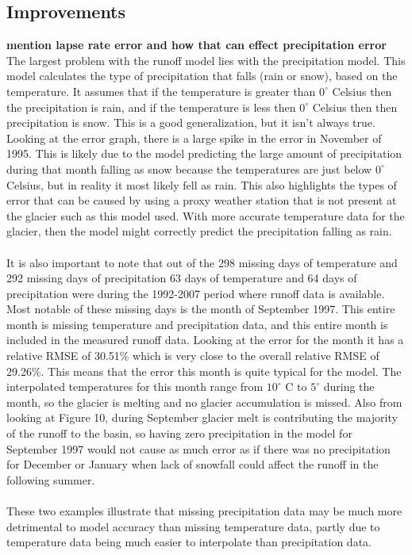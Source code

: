 \documentclass{article}
\begin{document}
\subsection{Improvements}
\textbf{mention lapse rate error and how that can effect precipitation error}
The largest problem with the runoff model lies with the precipitation model. This model calculates the type of precipitation that falls (rain or 
snow), based on the temperature. It assumes that if the temperature is greater than $0^\circ$ Celsius then the precipitation is rain, and if the 
temperature is less then $0^\circ$ Celsius then then precipitation is snow. This is a good generalization, but it isn't always true. Looking at the 
error graph, there is a large spike in the error in November of 1995. This is likely due to the model predicting the large amount of precipitation 
during that month falling as snow because the temperatures are just below $0^\circ$ Celsius, but in reality it most likely fell as rain. This also 
highlights the types of error that can be caused by using a proxy weather station that is not present at the glacier such as this model used. With 
more accurate temperature data for the glacier, then the model might correctly predict the precipitation falling as rain. 
\paragraph{}
It is also important to note that out of the 298 missing days of temperature and 292 missing days of precipitation 63 days of temperature and 64 
days of precipitation were during the 1992-2007 period where runoff data is available. Most notable of these missing days is the month of September 
1997. This entire month is missing temperature and precipitation data, and this entire month is included in the measured runoff data. Looking at the 
error for the month it has a relative RMSE of 30.51\% which is very close to the overall relative RMSE of 29.26\%. This 
means that the error this month is quite typical for the model. The interpolated temperatures for this month range from $10^\circ$ C to $5^\circ$ 
during the month, so the glacier is melting and no glacier accumulation is missed. Also from looking at Figure 10, during September glacier melt is 
contributing the majority of the runoff to the basin, so having zero precipitation in the model for September 1997 would not cause as much error as 
if there was no precipitation for December or January when lack of snowfall could affect the runoff in the following summer.
\paragraph{}
These two examples illustrate that missing precipitation data may be much more detrimental to model accuracy than missing temperature data, partly 
due to temperature data being much easier to interpolate than precipitation data.
\end{document}
